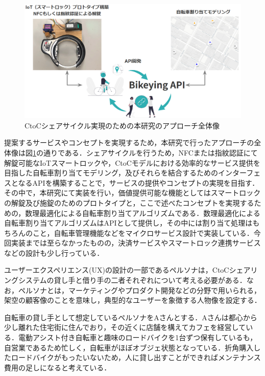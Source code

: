       \begin{figure}[b]
        \centering
        \includegraphics[scale=0.58]
        {figures/approach.png}
        \caption{CtoCシェアサイクル実現のための本研究のアプローチ全体像}
        \label{fig:CtoCシェアサイクル実現のための本研究のアプローチ全体像}
      \end{figure}
      \par 提案するサービスやコンセプトを実現するため，本研究で行ったアプローチの全体像は図\ref{fig:CtoCシェアサイクル実現のための本研究のアプローチ全体像}の通りである．シェアサイクルを行うため，NFCまたは指紋認証にて解錠可能なIoTスマートロックや，CtoCモデルにおける効率的なサービス提供を目指した自転車割り当てモデリング，及びそれらを結合するためのインターフェスとなるAPIを構築することで，サービスの提供やコンセプトの実現を目指す．その中で，本研究にて実装を行い，価値提供可能な機能としてはスマートロックの解錠及び施錠のためのプロトタイプと，ここで述べたコンセプトを実現するための，数理最適化による自転車割り当てアルゴリズムである．数理最適化による自転車割り当てアルゴリズムはAPIとして提供し，その中には割り当て処理はもちろんのこと，自転車管理機能などをマイクロサービス設計で実装している．今回実装までは至らなかったものの，決済サービスやスマートロック連携サービスなどの設計も少し行っている．
      \par ユーザーエクスペリエンス(UX)の設計の一部であるペルソナは，CtoCシェアリングシステムの貸し手と借り手の二者それぞれについて考える必要がある．なお，ペルソナとは，マーケティングやプロダクト開発などの分野で用いられる，架空の顧客像のことを意味し，典型的なユーザーを象徴する人物像を設定する．
      \par 自転車の貸し手として想定しているペルソナをAさんとする．Aさんは都心から少し離れた住宅街に住んでおり，その近くに店舗を構えてカフェを経営している．電動アシスト付き自転車と趣味のロードバイクを1台ずつ保有しているも，自営業であるため忙しく，自転車がほぼオブジェ状態となっている．折角購入したロードバイクがもったいないため，人に貸し出すことができればメンテナンス費用の足しになると考えている．

